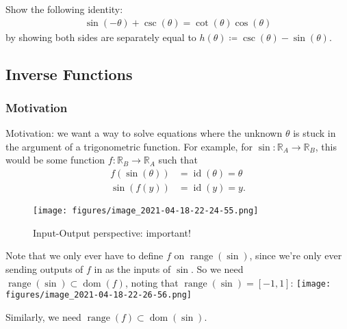 \begin{exercise}

Show the following identity:
\begin{align*}
{\sin(-\theta) + \csc(\theta)} = \cot(\theta) \cos(\theta)
\end{align*}
by showing both sides are separately equal to
\(h(\theta) \coloneqq\csc(\theta) - \sin(\theta)\).

\end{exercise}

\hypertarget{inverse-functions}{%
\subsection{Inverse Functions}\label{inverse-functions}}

\hypertarget{motivation}{%
\subsubsection{Motivation}\label{motivation}}

\begin{remark}

Motivation: we want a way to solve equations where the unknown
\(\theta\) is stuck in the argument of a trigonometric function. For
example, for \(\sin: {\mathbb{R}}_A \to {\mathbb{R}}_B\), this would be
some function \(f: {\mathbb{R}}_B \to {\mathbb{R}}_A\) such that
\begin{align*}
f(\sin(\theta)) &= \operatorname{id}(\theta) = \theta \\
\sin(f(y)) &= \operatorname{id}(y) = y
.\end{align*}

\begin{figure}
\centering
\texttt{[image: figures/image\_2021-04-18-22-24-55.png]}
\caption{Input-Output perspective: important!}
\end{figure}

Note that we only ever have to define \(f\) on
\(\mathop{\mathrm{range}}(\sin)\), since we're only ever sending outputs
of \(f\) in as the inputs of \(\sin\). So we need
\(\mathop{\mathrm{range}}(\sin) \subset \operatorname{dom}(f)\), noting
that \(\mathop{\mathrm{range}}(\sin) = [-1, 1]\):
\texttt{[image: figures/image\_2021-04-18-22-26-56.png]}

Similarly, we need
\(\mathop{\mathrm{range}}(f) \subset \operatorname{dom}(\sin)\).

\end{remark}

